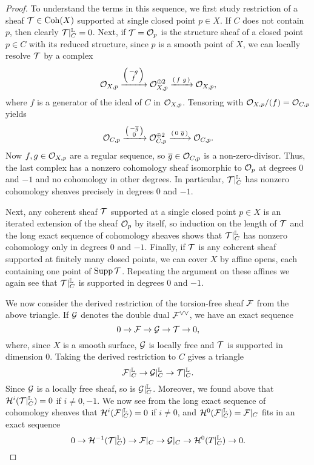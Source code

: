 \documentclass[letterpaper,11pt]{amsart}%
\theoremstyle{remark}
\begin{document}
\begin{proof}
\iffalse To understand the terms in this sequence, we first study restriction of a sheaf $\mathcal{T} \in \mathrm{Coh}(X)$ supported at single closed point $p \in X$. If $C$ does not contain $p$, then clearly $\mathcal{T}|_C^{\mathbb{L}} = 0$. Next, if $\mathcal{T} = \mathcal{O}_p$ is the structure sheaf of a closed point $p \in C$ with its reduced structure, since $p$ is a smooth point of $X$, we can locally resolve $\mathcal{T}$ by a complex
\[ \mathcal{O}_{X,p} \xrightarrow{\left(\begin{smallmatrix}-g\\f\end{smallmatrix}\right)} \mathcal{O}_{X,p}^{\oplus 2} \xrightarrow{\left(\begin{smallmatrix}f&g\end{smallmatrix}\right)} \mathcal{O}_{X,p}, \]
where $f$ is a generator of the ideal of $C$ in $\mathcal{O}_{X,p}$. Tensoring with $\mathcal{O}_{X,p}/(f) = \mathcal{O}_{C,p}$ yields
\[ \mathcal{O}_{C,p} \xrightarrow{\left(\begin{smallmatrix}-\overline{g}\\0\end{smallmatrix}\right)} \mathcal{O}_{C,p}^{\oplus 2} \xrightarrow{\left(\begin{smallmatrix}0&\overline{g}\end{smallmatrix}\right)} \mathcal{O}_{C,p}. \]
Now $f, g \in \mathcal{O}_{X,p}$ are a regular sequence, so $\overline{g} \in \mathcal{O}_{C,p}$ is a non-zero-divisor. Thus, the last complex has a nonzero cohomology sheaf isomorphic to $\mathcal{O}_p$ at degrees $0$ and $-1$ and no cohomology in other degrees. In particular, $\mathcal{T}|_C^{\mathbb{L}}$ has nonzero cohomology sheaves precisely in degrees $0$ and $-1$.

Next, any coherent sheaf $\mathcal{T}$ supported at a single closed point $p \in X$ is an iterated extension of the sheaf $\mathcal{O}_p$ by itself, so induction on the length of $\mathcal{T}$ and the long exact sequence of cohomology sheaves shows that $\mathcal{T}|_C^{\mathbb{L}}$ has nonzero cohomology only in degrees $0$ and $-1$. Finally, if $\mathcal{T}$ is any coherent sheaf supported at finitely many closed points, we can cover $X$ by affine opens, each containing one point of $\operatorname{\mathrm{Supp}} \mathcal{T}$. Repeating the argument on these affines we again see that $\mathcal{T}|_C^{\mathbb{L}}$ is supported in degrees $0$ and $-1$.

We now consider the derived restriction of the torsion-free sheaf $\mathcal{F}$ from the above triangle. If $\mathcal{G}$ denotes the double dual $\mathcal{F}^{\vee\vee}$, we have an exact sequence
\[ 0 \to \mathcal{F} \to \mathcal{G} \to \mathcal{T} \to 0, \]
where, since $X$ is a smooth surface, $\mathcal{G}$ is locally free and $\mathcal{T}$ is supported in dimension 0. Taking the derived restriction to $C$ gives a triangle
\[ \mathcal{F}|_C^{\mathbb{L}} \to \mathcal{G}|_C^{\mathbb{L}} \to \mathcal{T}|_C^{\mathbb{L}}. \]
Since $\mathcal{G}$ is a locally free sheaf, so is $\mathcal{G}|_C^{\mathbb{L}}$. Moreover, we found above that $\mathcal{H}^i(\mathcal{T}|_C^{\mathbb{L}}) = 0$ if $i \neq 0,-1$. We now see from the long exact sequence of cohomology sheaves that $\mathcal{H}^i(\mathcal{F}|_C^{\mathbb{L}}) = 0$ if $i \neq 0$, and $\mathcal{H}^0(\mathcal{F}|_C^{\mathbb{L}}) = \mathcal{F}|_C$ fits in an exact sequence
\[ 0 \to \mathcal{H}^{-1}(\mathcal{T}|_C^{\mathbb{L}}) \to \mathcal{F}|_C \to \mathcal{G}|_C \to \mathcal{H}^0(T|_C^{\mathbb{L}}) \to 0. \]


\end{proof}
\end{document}
